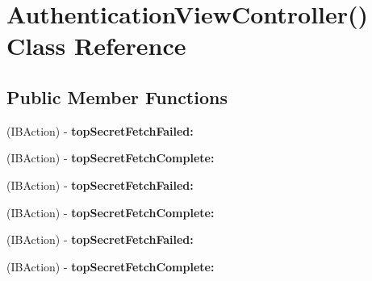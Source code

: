 \hypertarget{interface_authentication_view_controller_07_08}{
\section{\-Authentication\-View\-Controller() \-Class \-Reference}
\label{interface_authentication_view_controller_07_08}
}
\subsection*{\-Public \-Member \-Functions}
\begin{DoxyCompactItemize}
\item 
\hypertarget{interface_authentication_view_controller_07_08_a57486b58cfda1c6ce94f774f3e12f34d}{
(\-I\-B\-Action) -\/ {\bfseries top\-Secret\-Fetch\-Failed\-:}}
\label{interface_authentication_view_controller_07_08_a57486b58cfda1c6ce94f774f3e12f34d}

\item 
\hypertarget{interface_authentication_view_controller_07_08_a88b1260bde333379e393d4542f3d253f}{
(\-I\-B\-Action) -\/ {\bfseries top\-Secret\-Fetch\-Complete\-:}}
\label{interface_authentication_view_controller_07_08_a88b1260bde333379e393d4542f3d253f}

\item 
\hypertarget{interface_authentication_view_controller_07_08_a57486b58cfda1c6ce94f774f3e12f34d}{
(\-I\-B\-Action) -\/ {\bfseries top\-Secret\-Fetch\-Failed\-:}}
\label{interface_authentication_view_controller_07_08_a57486b58cfda1c6ce94f774f3e12f34d}

\item 
\hypertarget{interface_authentication_view_controller_07_08_a88b1260bde333379e393d4542f3d253f}{
(\-I\-B\-Action) -\/ {\bfseries top\-Secret\-Fetch\-Complete\-:}}
\label{interface_authentication_view_controller_07_08_a88b1260bde333379e393d4542f3d253f}

\item 
\hypertarget{interface_authentication_view_controller_07_08_a57486b58cfda1c6ce94f774f3e12f34d}{
(\-I\-B\-Action) -\/ {\bfseries top\-Secret\-Fetch\-Failed\-:}}
\label{interface_authentication_view_controller_07_08_a57486b58cfda1c6ce94f774f3e12f34d}

\item 
\hypertarget{interface_authentication_view_controller_07_08_a88b1260bde333379e393d4542f3d253f}{
(\-I\-B\-Action) -\/ {\bfseries top\-Secret\-Fetch\-Complete\-:}}
\label{interface_authentication_view_controller_07_08_a88b1260bde333379e393d4542f3d253f}


\end{DoxyCompactItemize}
